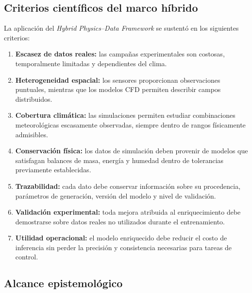 \subsection{Criterios científicos del marco híbrido}
\label{subsec:criterios_cientificos_hybrid}

La aplicación del \textit{Hybrid Physics--Data Framework} se sustentó en los siguientes criterios:

\begin{enumerate}
    \item \textbf{Escasez de datos reales:} las campañas experimentales son costosas, temporalmente limitadas y dependientes del clima.
    
    \item \textbf{Heterogeneidad espacial:} los sensores proporcionan observaciones puntuales, mientras que los modelos CFD permiten describir campos distribuidos.
    
    \item \textbf{Cobertura climática:} las simulaciones permiten estudiar combinaciones meteorológicas escasamente observadas, siempre dentro de rangos físicamente admisibles.
    
    \item \textbf{Conservación física:} los datos de simulación deben provenir de modelos que satisfagan balances de masa, energía y humedad dentro de tolerancias previamente establecidas.
    
    \item \textbf{Trazabilidad:} cada dato debe conservar información sobre su procedencia, parámetros de generación, versión del modelo y nivel de validación.
    
    \item \textbf{Validación experimental:} toda mejora atribuida al enriquecimiento debe demostrarse sobre datos reales no utilizados durante el entrenamiento.
    
    \item \textbf{Utilidad operacional:} el modelo enriquecido debe reducir el costo de inferencia sin perder la precisión y consistencia necesarias para tareas de control.
\end{enumerate}

\subsection{Alcance epistemológico}
\label{subsec:alcance_epistemologico_hybrid}

